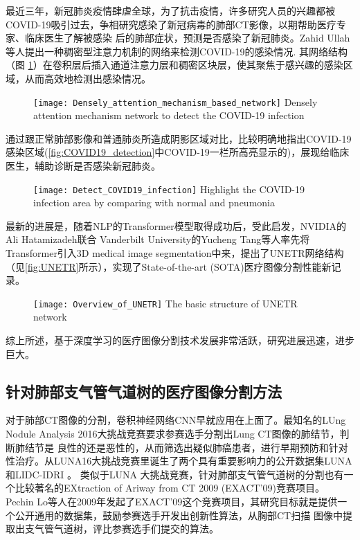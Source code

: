 	最近三年，新冠肺炎疫情肆虐全球，为了抗击疫情，许多研究人员的兴趣都被COVID-19吸引过去，争相研究感染了新冠病毒的肺部CT影像，以期帮助医疗专家、临床医生了解被感染
	后的肺部症状，预测是否感染了新冠肺炎。Zahid Ullah等人\cite{Ullah2023DenselyAM}提出一种稠密型注意力机制的网络来检测COVID-19的感染情况. 其网络结构（图
	\ref{fig:COVID19}）在卷积层后插入通道注意力层和稠密区块层，使其聚焦于感兴趣的感染区域，从而高效地检测出感染情况。
	\begin{figure}[htp]
		\centering
		\texttt{[image: Densely\_attention\_mechanism\_based\_network]}
			{Densely attention mechanism network to detect the COVID-19 infection}
		\label{fig:COVID19}
	\end{figure}
	通过跟正常肺部影像和普通肺炎所造成阴影区域对比，比较明确地指出COVID-19感染区域(\autoref{fig:COVID19_detection}中COVID-19一栏所高亮显示的)，展现给临床医生，辅助诊断是否感染新冠肺炎。
	\begin{figure}[ht]
		\centering
		\texttt{[image: Detect\_COVID19\_infection]}
			{Highlight the COVID-19 infection area by comparing with normal and pneumonia}
		\label{fig:COVID19_detection}
	\end{figure}
	
	最新的进展是，随着NLP的Transformer模型\cite{Devlin2019BERTPO, NIPS2017Attention}取得成功后，受此启发，NVIDIA的Ali Hatamizadeh联合
	Vanderbilt University的Yucheng Tang等人\cite{unetr}率先将Transformer引入3D medical image segmentation中来，提出了UNETR网络结构
	（见\autoref{fig:UNETR}所示），实现了State-of-the-art (SOTA)医疗图像分割性能新记录。
	\begin{figure}[hbp]
		\centering
		\texttt{[image: Overview\_of\_UNETR]}
			{The basic structure of UNETR network}
		\label{fig:UNETR}
	\end{figure}
	
	综上所述，基于深度学习的医疗图像分割技术发展非常活跃，研究进展迅速，进步巨大。
	
	
	
	\subsection{针对肺部支气管气道树的医疗图像分割方法}
	对于肺部CT图像的分割，卷积神经网络CNN早就应用在上面了。最知名的LUng Nodule Analysis 2016大挑战竞赛要求参赛选手分割出Lung CT图像的肺结节，判断肺结节是
	良性的还是恶性的，从而筛选出疑似肺癌患者，进行早期预防和针对性治疗。从LUNA16大挑战竞赛里诞生了两个具有重要影响力的公开数据集LUNA和LIDC-IDRI
	\cite{Charles2011LIDC}。 类似于LUNA	大挑战竞赛，针对肺部支气管气道树的分割也有一个比较著名的EXtraction of Ariway from CT 2009 (EXACT'09)竞赛项目。
	Pechin Lo等人\cite{Lo2012ExtractionOA}在2009年发起了EXACT'09这个竞赛项目，其研究目标就是提供一个公开通用的数据集，鼓励参赛选手开发出创新性算法，从胸部CT扫描
	图像中提取出支气管气道树，评比参赛选手们提交的算法。
	
